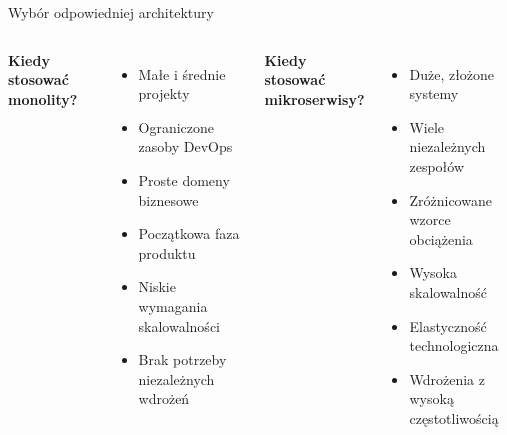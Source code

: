 \documentclass[aspectratio=169,xcolor=table]{beamer}
\begin{document}
\begin{frame}{Wybór odpowiedniej architektury}
  \begin{columns}
    \textbf{Kiedy stosować monolity?}
    \begin{itemize}
      \item Małe i średnie projekty
      \item Ograniczone zasoby DevOps
      \item Proste domeny biznesowe
      \item Początkowa faza produktu
      \item Niskie wymagania skalowalności
      \item Brak potrzeby niezależnych wdrożeń
    \end{itemize}
    
    \textbf{Kiedy stosować mikroserwisy?}
    \begin{itemize}
      \item Duże, złożone systemy
      \item Wiele niezależnych zespołów
      \item Zróżnicowane wzorce obciążenia
      \item Wysoka skalowalność
      \item Elastyczność technologiczna
      \item Wdrożenia z wysoką częstotliwością
    \end{itemize}
  \end{columns}
\end{frame}
\end{document}
